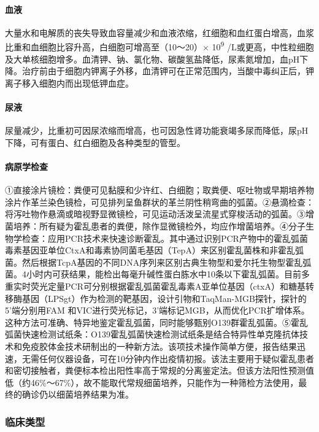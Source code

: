 \paragraph{血液}

大量水和电解质的丧失导致血容量减少和血液浓缩，红细胞和血红蛋白增高，血浆比重和血细胞比容升高，白细胞可增高至（10～20）×
10\textsuperscript{9}
/L或更高，中性粒细胞及大单核细胞增多。血清钾、钠、氯化物、碳酸氢盐降低，尿素氮增加，血pH下降。治疗前由于细胞内钾离子外移，血清钾可在正常范围内，当酸中毒纠正后，钾离子移入细胞内而出现低钾血症。

\paragraph{尿液}

尿量减少，比重初可因尿浓缩而增高，也可因急性肾功能衰竭多尿而降低，尿pH下降，可有蛋白、红白细胞及各种类型的管型。

\paragraph{病原学检查}

①直接涂片镜检：粪便可见黏膜和少许红、白细胞；取粪便、呕吐物或早期培养物涂片作革兰染色镜检，可见排列呈鱼群状的革兰阴性稍弯曲的弧菌。②悬滴检查：将泻吐物作悬滴或暗视野显微镜检，可见运动活泼呈流星式穿梭活动的弧菌。③增菌培养：所有疑为霍乱患者的粪便，除作显微镜检外，均应作增菌培养。④分子生物学检查：应用PCR技术来快速诊断霍乱。其中通过识别PCR产物中的霍乱弧菌毒素基因亚单位CtxA和毒素协同菌毛基因（TepA）来区别霍乱菌株和非霍乱弧菌。然后根据TcpA基因的不同DNA序列来区别古典生物型和爱尔托生物型霍乱弧菌。4小时内可获结果，能检出每毫升碱性蛋白胨水中10条以下霍乱弧菌。目前多重实时荧光定量PCR可分别根据霍乱弧菌霍乱毒素A亚单位基因（ctxA）和糖基转移酶基因（LPSgt）作为检测的靶基因，设计引物和TaqMan-MGB探针，探针的5'端分别用FAM
和VIC进行荧光标记，3'端标记MGB，从而优化PCR扩增体系。这种方法可准确、特异地鉴定霍乱弧菌，同时能够甄别O139群霍乱弧菌。⑤霍乱弧菌快速检测试纸条：O139霍乱弧菌快速检测试纸条是结合特异性单克隆抗体技术和免疫胶体金技术研制出的一种新方法。该项技术操作简单方便，报告结果迅速，无需任何仪器设备，可在10分钟内作出疫情初报。该法主要用于疑似霍乱患者和密切接触者，粪便标本检出阳性率高于常规的分离鉴定法。但该方法阳性预测值低（约46\%～67\%），故不能取代常规细菌培养，只能作为一种筛检方法使用，最终的确诊仍以细菌培养结果为准。

\subsubsection{临床类型}

